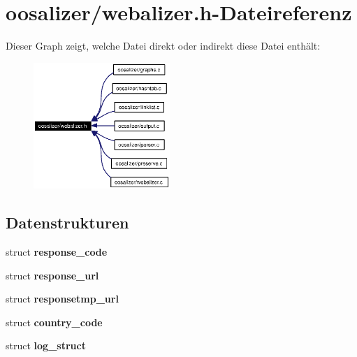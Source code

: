 \section{oosalizer/webalizer.h-Dateireferenz}
\label{webalizer_8h}


Dieser Graph zeigt, welche Datei direkt oder indirekt diese Datei enth\"{a}lt:\begin{figure}[H]
\begin{center}
\leavevmode
\includegraphics[width=146pt]{webalizer_8h__dep__incl}
\end{center}
\end{figure}
\subsection*{Datenstrukturen}
\begin{CompactItemize}
\item 
struct {\bf response\_\-code}
\item 
struct {\bf response\_\-url}
\item 
struct {\bf responsetmp\_\-url}
\item 
struct {\bf country\_\-code}
\item 
struct {\bf log\_\-struct}
\end{CompactItemize}
